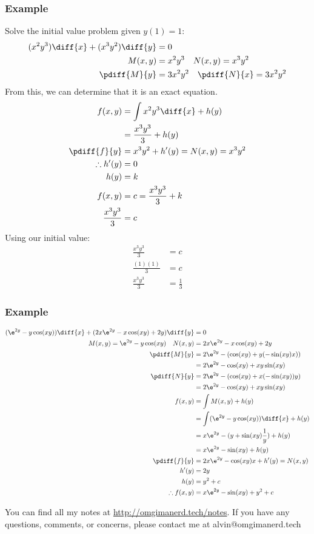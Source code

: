 \documentclass{math}
\begin{document}
\subsubsection*{Example}
Solve the initial value problem given \( y(1) = 1 \):
\begin{align*}
  (x^2y^3)\diff{x}+(x^3y^2)\diff{y} &= 0 \\
  M(x,y) &= x^2y^3 \quad N(x,y) = x^3y^2 \\
  \pdiff{M}{y} &= 3x^2y^2 \quad \pdiff{N}{x} = 3x^2y^2
\end{align*}
From this, we can determine that it is an exact equation.
\begin{align*}
  f(x,y) &= \int x^2y^3\diff{x}+h(y) \\
  &= \frac{x^3y^3}{3}+h(y) \\
  \pdiff{f}{y} &= x^3y^2+h'(y) = N(x,y) = x^3y^2 \\
  \therefore h'(y) &= 0 \\
  h(y) &= k \\
  f(x,y) &= c = \frac{x^3y^3}{3}+k \\
  \frac{x^3y^3}{3} &= c
\end{align*}
Using our initial value:
\begin{align*}
  \frac{x^3y^3}{3} &= c \\
  \frac{(1)(1)}{3} &= c \\
  \frac{x^3y^3}{3} &= \frac{1}{3}
\end{align*}

\subsubsection*{Example}
\begin{align*}
  (\e^{2y}-y\cos(xy))\diff{x}+(2x\e^{2y}-x\cos(xy)+2y)\diff{y} &= 0 \\
  M(x,y) = \e^{2y}-y\cos(xy) \quad N(x,y) &= 2x\e^{2y}-x\cos(xy)+2y \\
  \pdiff{M}{y} &= 2\e^{2y}-(\cos(xy)+y(-\sin(xy)x)) \\
  &= 2\e^{2y}-\cos(xy)+xy\sin(xy) \\
  \pdiff{N}{y} &= 2\e^{2y}-(\cos(xy)+x(-\sin(xy))y) \\
  &= 2\e^{2y}-\cos(xy)+xy\sin(xy) \\
  f(x,y) &= \int M(x,y)+h(y) \\
  &= \int(\e^{2y}-y\cos(xy))\diff{x}+h(y) \\
  &= x\e^{2y}-(y+\sin(xy)\frac{1}{y})+h(y) \\
  &= x\e^{2y}-\sin(xy)+h(y) \\
  \pdiff{f}{y} &= 2x\e^{2y}-\cos(xy)x+h'(y) = N(x,y) \\
  h'(y) &= 2y \\
  h(y) &= y^2+c \\
  \therefore f(x,y) &= x\e^{2y}-\sin(xy)+y^2+c
\end{align*}

\begin{center}
  You can find all my notes at \url{http://omgimanerd.tech/notes}. If you have
  any questions, comments, or concerns, please contact me at
  alvin@omgimanerd.tech
\end{center}
\end{document}
